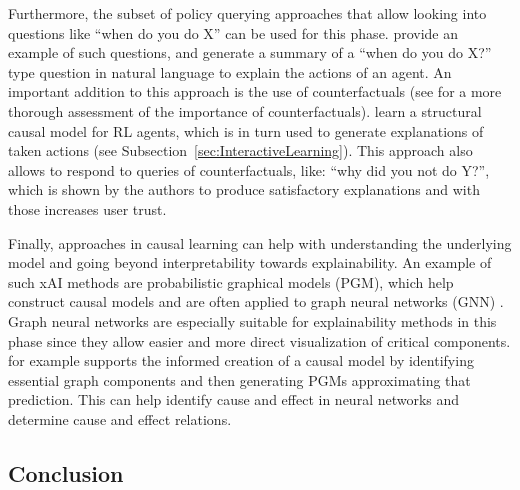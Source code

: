 \documentclass[twoside,11pt]{article}
\begin{document}
Furthermore, the subset of policy querying approaches that allow looking into questions like ``when do you do X'' can be used for this phase.
\citet{HayesShah:2017:AutonomousPolicyExplanation} provide an example of such questions, and generate a summary of a ``when do you do X?'' type question in natural language to explain the actions of an agent. An important addition to this approach is the use of counterfactuals (see \citet{EvansEtAl:2021:ExplainabilityParadox} for a more thorough assessment of the importance of counterfactuals). \citet{MadumalEtAl:2020:CausalRLCFs} learn a structural causal model for RL agents, which is in turn used to generate explanations of taken actions (see Subsection~\ref{sec:InteractiveLearning}). This approach also allows to respond to queries of counterfactuals, like: ``why did you not do Y?'', which is shown by the authors to produce satisfactory explanations and with those increases user trust.


Finally, approaches in causal learning can help with understanding the underlying model and going beyond interpretability towards explainability.
An example of such xAI methods are probabilistic graphical models (PGM), which help construct causal models and are often applied to graph neural networks (GNN) \citep{Saranti:2019:LearningCompetencePGMs}. Graph neural networks are especially suitable for explainability methods in this phase since they allow easier and more direct visualization of critical components. \citet{Vu:2020:PGMExplainer} for example supports the informed creation of a causal model by identifying essential graph components and then generating PGMs approximating that prediction. This can help identify cause and effect in neural networks and determine cause and effect relations.


\subsection{Conclusion}

\end{document}
